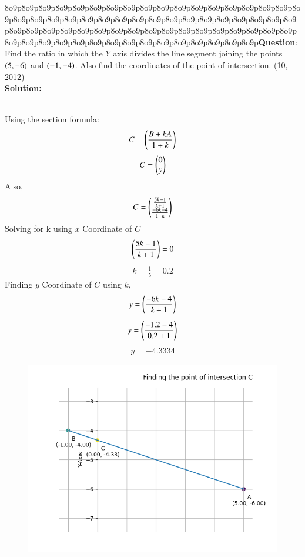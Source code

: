 \documentclass[journal]{IEEEtran}
\begin{document}
8o9p8o9p8o9p8o9p8o9p8o9p8o9p8o9p8o9p8o9p8o9p8o9p8o9p8o9p8o9p8o9p8o9p8o9p8o9p8o9p8o9p8o9p8o9p8o9p8o9p8o9p8o9p8o9p8o9p8o9p8o9p8o9p8o9p8o9p8o9p8o9p8o9p8o9p8o9p8o9p8o9p8o9p8o9p8o9p8o9p8o9p8o9p8o9p8o9p8o9p8o9p8o9p8o9p8o9p8o9p8o9p8o9p8o9p8o9p8o9p8o9p8o9p8o9p8o9p8o9p8o9p8o9p\textbf{Question}:\\
Find the ratio in which the $Y$ axis divides the line segment joining the points $\left(5, -6\right)$
and $\left(-1, -4\right)$. Also find the coordinates of the point of intersection. \hfill (10, 2012)
\\ \textbf{Solution: }\\
    \begin{table}[h!]    
      \centering
      
      \caption{}
    \end{table}\\
Using the section formula:
    \begin{align}
        C  = \left(\frac{B + kA}{1 + k}\right) \label{eq1.1.5.13.1}
    \end{align}
    \begin{align}
        C = \begin{pmatrix}0 \\ y\end{pmatrix} \label{eq1.1.5.13.2}
    \end{align}
Also,
    \begin{align}
        C = \begin{pmatrix}\frac{5k-1}{k+1} \\ \frac{-6k-4}{1+k}\end{pmatrix} \label{eq1.1.5.13.3}
    \end{align}
Solving for k using $x$ Coordinate of $C$
    \begin{align}
        \left(\frac{5k-1}{k+1}\right) = 0  \label{eq1.1.5.13.4}
    \end{align}
    \begin{align}
        k = \frac{1}{5} = 0.2\label{eq1.1.5.13.5}
    \end{align}
Finding $y$ Coordinate of $C$ using $k$,
    \begin{align}
        y = \left(\frac{-6k-4}{k+1}\right)  \label{eq1.1.5.13.6}
    \end{align}
    \begin{align}
        y = \left(\frac{-1.2-4}{0.2+1}\right) \label{eq1.1.5.13.7}
    \end{align}
    \begin{align}
        y = -4.3334 \label{eq1.1.5.13.8}
    \end{align}
    \begin{figure}[h]
        \centering
       \includegraphics[width=0.7\linewidth]{figs/fig1.png}
       \caption{}
       \label{graph}
    \end{figure}
\end{document}
